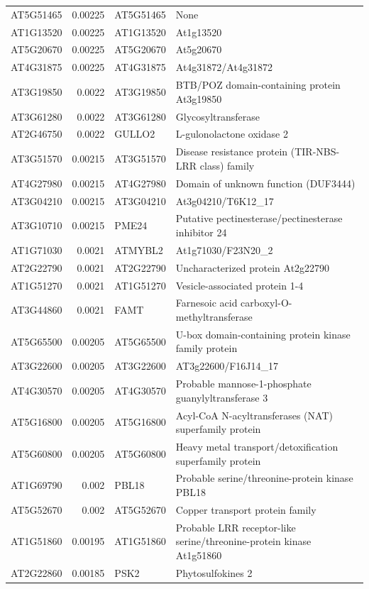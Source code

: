 \documentclass[11pt]{article}
\begin{document}
\begin{center}
\begin{tabular}{lrll}
AT5G51465 & 0.00225 & AT5G51465 & None\\
AT1G13520 & 0.00225 & AT1G13520 & At1g13520\\
AT5G20670 & 0.00225 & AT5G20670 & At5g20670\\
AT4G31875 & 0.00225 & AT4G31875 & At4g31872/At4g31872\\
AT3G19850 & 0.0022 & AT3G19850 & BTB/POZ domain-containing protein At3g19850\\
AT3G61280 & 0.0022 & AT3G61280 & Glycosyltransferase\\
AT2G46750 & 0.0022 & GULLO2 & L-gulonolactone oxidase 2\\
AT3G51570 & 0.00215 & AT3G51570 & Disease resistance protein (TIR-NBS-LRR class) family\\
AT4G27980 & 0.00215 & AT4G27980 & Domain of unknown function (DUF3444)\\
AT3G04210 & 0.00215 & AT3G04210 & At3g04210/T6K12\_17\\
AT3G10710 & 0.00215 & PME24 & Putative pectinesterase/pectinesterase inhibitor 24\\
AT1G71030 & 0.0021 & ATMYBL2 & At1g71030/F23N20\_2\\
AT2G22790 & 0.0021 & AT2G22790 & Uncharacterized protein At2g22790\\
AT1G51270 & 0.0021 & AT1G51270 & Vesicle-associated protein 1-4\\
AT3G44860 & 0.0021 & FAMT & Farnesoic acid carboxyl-O-methyltransferase\\
AT5G65500 & 0.00205 & AT5G65500 & U-box domain-containing protein kinase family protein\\
AT3G22600 & 0.00205 & AT3G22600 & AT3g22600/F16J14\_17\\
AT4G30570 & 0.00205 & AT4G30570 & Probable mannose-1-phosphate guanylyltransferase 3\\
AT5G16800 & 0.00205 & AT5G16800 & Acyl-CoA N-acyltransferases (NAT) superfamily protein\\
AT5G60800 & 0.00205 & AT5G60800 & Heavy metal transport/detoxification superfamily protein\\
AT1G69790 & 0.002 & PBL18 & Probable serine/threonine-protein kinase PBL18\\
AT5G52670 & 0.002 & AT5G52670 & Copper transport protein family\\
AT1G51860 & 0.00195 & AT1G51860 & Probable LRR receptor-like serine/threonine-protein kinase At1g51860\\
AT2G22860 & 0.00185 & PSK2 & Phytosulfokines 2\\

\end{tabular}
\end{center}
\end{document}
